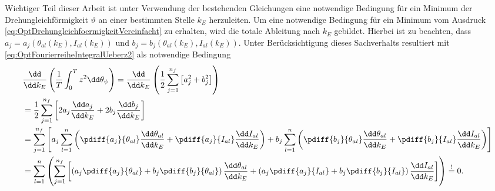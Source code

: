 %
%
%
Wichtiger Teil dieser Arbeit ist unter Verwendung der bestehenden Gleichungen eine
notwendige Bedingung für ein Minimum der Drehungleichförmigkeit $\vartheta$ an einer bestimmten Stelle $k_E$ herzuleiten.
Um eine notwendige Bedingung für ein Minimum vom Ausdruck \eqref{eq:OptDrehungleichfoermigkeitVereinfacht} 
zu erhalten, wird die totale Ableitung nach $k_E$ gebildet.
Hierbei ist zu beachten, dass $a_j = a_j\left(\theta_{al} \left(k_E\right), I_{al}\left(k_E\right) \right)$ und $b_j = b_j\left(\theta_{al}\left(k_E\right), I_{al}\left(k_E\right) \right)$. Unter Berücksichtigung dieses Sachverhalts resultiert mit	\eqref{eq:OptFourierreiheIntegralUeberz2}
als notwendige Bedingung
%
\begin{equation}
	\begin{split}
	  & \frac{\dd}{\dd k_E}  \left(\frac{1}{T} \int_0^T{z^2 \dd \theta_{\psi}}\right) = \frac{\dd}{\dd k_E} \left( \frac{1}{2} \sum_{j=1}^{n_f}{\left[ a_j^2 + b_j^2\right]} \right) \\
	  & %
		  = \frac{1}{2} \sum_{j=1}^{n_f} { \left[ 2 a_j \frac{\dd a_j}{\dd k_E} + 2 b_j \frac{\dd b_j}{\dd k_E}\right] } \\
	  & = \sum_{j=1}^{n_f} { \left[      a_j \sum_{l=1}^{n} {\left( \pdiff{a_j}{{\theta_{al}}} \frac{\dd \theta_{al}}{\dd k_E} + \pdiff{a_j}{{I_{al}}} \frac{\dd I_{al}}{\dd k_E} \right) } 
	    + b_j \sum_{l=1}^{n} {\left( \pdiff{b_j}{{\theta_{al}}} \frac{\dd \theta_{al}}{\dd k_E} + \pdiff{b_j}{{I_{al}}} \frac{\dd I_{al}}{\dd k_E} \right) }  \right] } \\
		& = \sum_{l=1}^{n} { \left( \sum_{j=1}^{n_f}   {\left[ \left( a_j \pdiff{a_j}{{\theta_{al}}} + b_j  \pdiff{b_j}{{\theta_{al}}} \right) \frac{\dd \theta_{al}}{\dd k_E} 
		  + \left( a_j \pdiff{a_j}{{I_{al}}}  + b_j \pdiff{b_j}{{I_{al}}} \right) \frac{\dd I_{al}}{\dd k_E}  \right] }  \right) } 	\stackrel{!}= 0.
	\end{split}
	\label{eq:OptNotwBedUrsprForm}
\end{equation}
%
%
%
%
%
%
%
%
%
